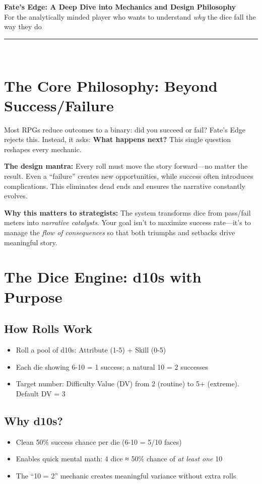 \documentclass[11pt]{article}
\begin{document}
\begin{center}
    {\LARGE\bfseries Fate's Edge: A Deep Dive into Mechanics and Design Philosophy}\\[0.5em]
    {\large For the analytically minded player who wants to understand \textit{why} the dice fall the way they do}\\[1.5em]
    \rule{0.6\textwidth}{0.5pt}\\[1em]
\end{center}

\section{The Core Philosophy: Beyond Success/Failure}

Most RPGs reduce outcomes to a binary: did you succeed or fail? Fate's Edge rejects this. Instead, it asks: \textbf{What happens next?} This single question reshapes every mechanic.

\textbf{The design mantra:} Every roll must move the story forward—no matter the result. Even a ``failure'' creates new opportunities, while success often introduces complications. This eliminates dead ends and ensures the narrative constantly evolves.

\textbf{Why this matters to strategists:} The system transforms dice from pass/fail meters into \textit{narrative catalysts}. Your goal isn't to maximize success rate—it's to manage the \textit{flow of consequences} so that both triumphs and setbacks drive meaningful story.

\section{The Dice Engine: d10s with Purpose}

\subsection{How Rolls Work}
\begin{itemize}
    \item Roll a pool of d10s: Attribute (1-5) + Skill (0-5)
    \item Each die showing 6-10 = 1 success; a natural 10 = 2 successes
    \item Target number: Difficulty Value (DV) from 2 (routine) to 5+ (extreme). Default DV = 3
\end{itemize}

\subsection{Why d10s?}
\begin{itemize}
    \item Clean 50\% success chance per die (6-10 = 5/10 faces)
    \item Enables quick mental math: 4 dice ≈ 50\% chance of \textit{at least one} 10
    \item The ``10 = 2'' mechanic creates meaningful variance without extra rolls
\end{itemize}
\end{document}
